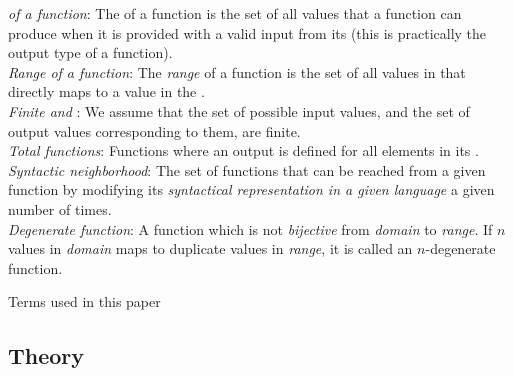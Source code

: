 \documentclass[preprint,nonatbib]{sigplanconf}\usepackage[]{graphicx}\usepackage[]{color}
\begin{document}
\begin{infobox}
\noindent\emph{\fOutput of a function}: The \foutput of a function is the set of all values that a function can produce when it is provided with a valid input from its \finput (this is practically the output type of a function).\\
\noindent\emph{Range of a function}: The \emph{range} of a function is the set of all values in \foutput that directly maps to a value in the \finput.\\
\noindent\emph{Finite \finput and \foutput}: We assume that the set of possible input values, and the set of output values corresponding to them, are finite.\\
\noindent\emph{Total functions}: Functions where an output is defined for all elements in its \finput.\\
\noindent\emph{Syntactic neighborhood}: The set of functions that can be reached from a given function by modifying its \emph{syntactical representation in a given language} a given number of times.\\
\noindent\emph{Degenerate function}: A function which is not \emph{bijective} from \emph{domain} to \emph{range}. If $n$ values in \emph{domain} maps to duplicate values in \emph{range}, it is called an $n$-degenerate function.
\caption{Terms used in this paper}
\label{box:terms}
\end{infobox}
\subsection{Theory}
\end{document}
